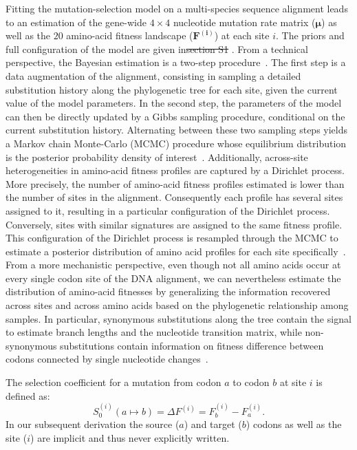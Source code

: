 \documentclass[10pt,letterpaper]{article}
\newcommand{\Sphy}{S_{0}}
\providecommand{\DIFaddtex}[1]{{\protect\color{blue}\uwave{#1}}} %
\providecommand{\DIFdeltex}[1]{{\protect\color{red}\sout{#1}}}                      %
\providecommand{\DIFaddbegin}{} %
\providecommand{\DIFaddend}{} %
\providecommand{\DIFdelbegin}{} %
\providecommand{\DIFdelend}{} %
\providecommand{\DIFadd}[1]{\texorpdfstring{\DIFaddtex{#1}}{#1}} %
\providecommand{\DIFdel}[1]{\texorpdfstring{\DIFdeltex{#1}}{}} %
\newcommand{\DIFscaledelfig}{0.5}
\newlength{\DIFdelgraphicswidth} %
\newlength{\DIFdelgraphicsheight} %
\newcommand{\DIFaddincludegraphics}[2][]{{\color{blue}\fbox{\DIFOincludegraphics[#1]{#2}}}} %
\newcommand{\DIFdelincludegraphics}[2][]{%
\sbox{\DIFdelgraphicsbox}{\DIFOincludegraphics[#1]{#2}}%
\settoboxwidth{\DIFdelgraphicswidth}{\DIFdelgraphicsbox} %
\settoboxtotalheight{\DIFdelgraphicsheight}{\DIFdelgraphicsbox} %
\scalebox{\DIFscaledelfig}{%
\parbox[b]{\DIFdelgraphicswidth}{\usebox{\DIFdelgraphicsbox}\\[-\baselineskip] \rule{\DIFdelgraphicswidth}{0em}}\llap{\resizebox{\DIFdelgraphicswidth}{\DIFdelgraphicsheight}{%
\setlength{\unitlength}{\DIFdelgraphicswidth}%
\begin{picture}(1,1)%
\thicklines\linethickness{2pt} %
{\color[rgb]{1,0,0}\put(0,0){\framebox(1,1){}}}%
{\color[rgb]{1,0,0}\put(0,0){\line( 1,1){1}}}%
{\color[rgb]{1,0,0}\put(0,1){\line(1,-1){1}}}%
\end{picture}%
}\hspace*{3pt}}} %
} %
\DeclareRobustCommand{\DIFaddbegin}{\DIFOaddbegin \let\includegraphics\DIFaddincludegraphics} %
\DeclareRobustCommand{\DIFaddend}{\DIFOaddend \let\includegraphics\DIFOincludegraphics} %
\DeclareRobustCommand{\DIFdelbegin}{\DIFOdelbegin \let\includegraphics\DIFdelincludegraphics} %
\DeclareRobustCommand{\DIFdelend}{\DIFOaddend \let\includegraphics\DIFOincludegraphics} %
\begin{document}
Fitting the mutation-selection model on a multi-species sequence alignment leads to an estimation of the gene-wide $4 \times 4$ nucleotide mutation rate matrix ($\bm{\mu}$) as well as the $20$ amino-acid fitness landscape ($\bm{F^{(i)}}$) at each site $i$.
The priors and full configuration of the model are given in\DIFdelbegin \DIFdel{section S1}\DIFdelend \DIFaddbegin \DIFadd{~} \DIFadd{(section~1)}\DIFaddend .
From a technical perspective, the Bayesian estimation is a two-step procedure~\cite{rodrigue_bayesian_2008}.
The first step is a data augmentation of the alignment, consisting in sampling a detailed substitution history along the phylogenetic tree for each site, given the current value of the model parameters.
In the second step, the parameters of the model can then be directly updated by a Gibbs sampling procedure, conditional on the current substitution history.
Alternating between these two sampling steps yields a Markov chain Monte-Carlo (MCMC) procedure whose equilibrium distribution is the posterior probability density of interest~\cite{lartillot_bayesian_2004, rodrigue_bayesian_2008}.
Additionally, across-site heterogeneities in amino-acid fitness profiles are captured by a Dirichlet process.
More precisely, the number of amino-acid fitness profiles estimated is lower than the number of sites in the alignment.
Consequently each profile has several sites assigned to it, resulting in a particular configuration of the Dirichlet process.
Conversely, sites with similar signatures are assigned to the same fitness profile.
This configuration of the Dirichlet process is resampled through the MCMC to estimate a posterior distribution of amino acid profiles for each site specifically~\cite{rodrigue_mutationselection_2010, lartillot_inference_2013}.
From a more mechanistic perspective, even though not all amino acids occur at every single codon site of the DNA alignment, we can nevertheless estimate the distribution of amino-acid fitnesses by generalizing the information recovered across sites and across amino acids based on the phylogenetic relationship among samples.
In particular, synonymous substitutions along the tree contain the signal to estimate branch lengths and the nucleotide transition matrix, while non-synonymous substitutions contain information on fitness difference between codons connected by single nucleotide changes~\cite{rodrigue_mutationselection_2010}.

The selection coefficient for a mutation from codon $a$ to codon $b$ at site $i$ is defined as:
\begin{equation}
\Sphy^{(i)} (a \mapsto b) = \Delta F^{(i)} = F^{(i)}_{b} - F^{(i)}_{a}.
\end{equation}
In our subsequent derivation the source ($a$) and target ($b$) codons as well as the site ($i$) are implicit and thus never explicitly written.
\end{document}
